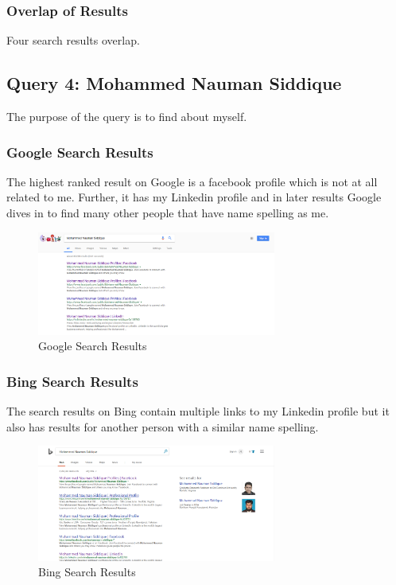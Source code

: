 \documentclass[12pt]{report}
\begin{document}
\subsubsection{Overlap of Results}
Four search results overlap.

\subsection{Query 4: Mohammed Nauman Siddique}
The purpose of the query is to find about myself.
\subsubsection{Google Search Results}
The highest ranked result on Google is a facebook profile which is not at all related to me. Further, it has my Linkedin profile and in later results Google dives in to find many other people that have name spelling as me.

\begin{figure}[ht]
  \centering
  \includegraphics[width=0.7\textwidth]{Query4_Google.PNG}
  \caption{Google Search Results}
  \label{fig:7}
\end{figure}

\subsubsection{Bing Search Results}
The search results on Bing contain multiple links to my Linkedin profile but it also has results for another person with a similar name spelling.

\begin{figure}[ht]
  \centering 
  \includegraphics[width=0.7\textwidth]{Query4_Bing.PNG}
  \caption{Bing Search Results}
  \label{fig:8}
\end{figure}
\end{document}
